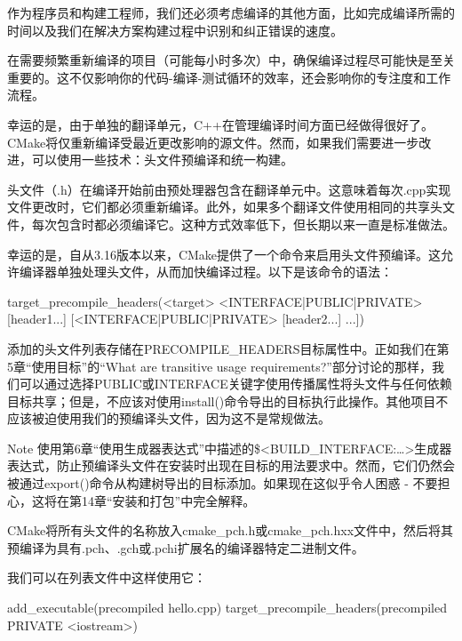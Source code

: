 
作为程序员和构建工程师，我们还必须考虑编译的其他方面，比如完成编译所需的时间以及我们在解决方案构建过程中识别和纠正错误的速度。


在需要频繁重新编译的项目（可能每小时多次）中，确保编译过程尽可能快是至关重要的。这不仅影响你的代码-编译-测试循环的效率，还会影响你的专注度和工作流程。

幸运的是，由于单独的翻译单元，C++在管理编译时间方面已经做得很好了。CMake将仅重新编译受最近更改影响的源文件。然而，如果我们需要进一步改进，可以使用一些技术：头文件预编译和统一构建。


头文件（.h）在编译开始前由预处理器包含在翻译单元中。这意味着每次.cpp实现文件更改时，它们都必须重新编译。此外，如果多个翻译文件使用相同的共享头文件，每次包含时都必须编译它。这种方式效率低下，但长期以来一直是标准做法。

幸运的是，自从3.16版本以来，CMake提供了一个命令来启用头文件预编译。这允许编译器单独处理头文件，从而加快编译过程。以下是该命令的语法：

\begin{shell}
target_precompile_headers(<target>
                          <INTERFACE|PUBLIC|PRIVATE> [header1...]
                         [<INTERFACE|PUBLIC|PRIVATE> [header2...]
...])
\end{shell}

添加的头文件列表存储在PRECOMPILE\_HEADERS目标属性中。正如我们在第5章“使用目标”的“What are transitive usage requirements?”部分讨论的那样，我们可以通过选择PUBLIC或INTERFACE关键字使用传播属性将头文件与任何依赖目标共享；但是，不应该对使用install()命令导出的目标执行此操作。其他项目不应该被迫使用我们的预编译头文件，因为这不是常规做法。

\begin{myNotic}{Note}
使用第6章“使用生成器表达式”中描述的\$<BUILD\_INTERFACE:…>生成器表达式，防止预编译头文件在安装时出现在目标的用法要求中。然而，它们仍然会被通过export()命令从构建树导出的目标添加。如果现在这似乎令人困惑 - 不要担心，这将在第14章“安装和打包”中完全解释。
\end{myNotic}

CMake将所有头文件的名称放入cmake\_pch.h或cmake\_pch.hxx文件中，然后将其预编译为具有.pch、.gch或.pchi扩展名的编译器特定二进制文件。

我们可以在列表文件中这样使用它：


\begin{cmake}
add_executable(precompiled hello.cpp)
target_precompile_headers(precompiled PRIVATE <iostream>)
\end{cmake}

